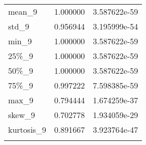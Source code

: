 \begin{longtable}{lrr}
mean\_9     &  1.000000 &  3.587622e-59 \\
std\_9      &  0.956944 &  3.195999e-54 \\
min\_9      &  1.000000 &  3.587622e-59 \\
25\%\_9      &  1.000000 &  3.587622e-59 \\
50\%\_9      &  1.000000 &  3.587622e-59 \\
75\%\_9      &  0.997222 &  7.598385e-59 \\
max\_9      &  0.794444 &  1.674259e-37 \\
skew\_9     &  0.702778 &  1.934059e-29 \\
kurtosis\_9 &  0.891667 &  3.923764e-47 \\

\\


\end{longtable}
